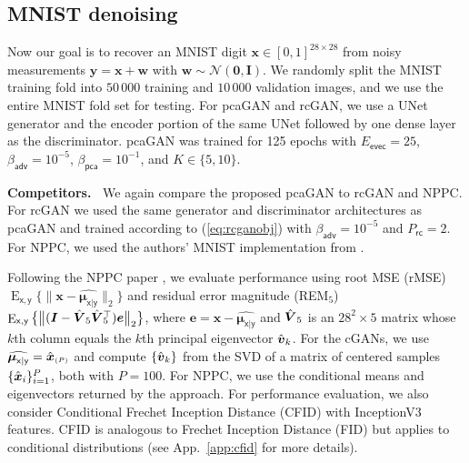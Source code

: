 \documentclass{article}
\theoremstyle{plain}
\theoremstyle{definition}
\theoremstyle{remark}
\renewcommand{\hat}{\widehat}
\newcommand{\hvec}[1]{\ensuremath{\Hat{\boldsymbol{#1}}}}
\renewcommand{\vec}[1]{\ensuremath{\boldsymbol{#1}}}
\newcommand{\mc}[1]{\ensuremath{\mathcal{#1}}}
\newcommand{\tran}{^{\top}}
\DeclareMathOperator{\E}{E}
\renewcommand{\eqref}[1]{(\ref{eq:#1})}
\newcommand{\secref}[1]{Sec.~\ref{sec:#1}}
\newcommand{\appref}[1]{App.~\ref{app:#1}}
\newcommand{\textr}[1]{\textcolor{red}{#1}}
\newcommand{\train}{_{\mathsf{rc}}}
\newcommand{\evec}{_{\mathsf{evec}}}
\newcommand{\betaadv}{\beta_{\mathsf{adv}}}
\newcommand{\betapca}{\beta_{\mathsf{pca}}}
\newcommand{\avgP}{_{\scriptscriptstyle (P)}}
\newcommand{\Exy}{\E_{\mathsf{x,y}}}
\newcommand{\muxgy}{\vec{\mu}_{\mathsf{x}|\mathsf{y}}}
\begin{document}

\subsection{MNIST denoising}\label{sec:mnistdenoising}
Now our goal is to recover an MNIST digit $\vec{x}\in[0,1]^{28\times 28}$ from noisy measurements $\vec{y} = \vec{x} + \vec{w}$ with $\vec{w}\sim\mc{N}(\vec{0}, \vec{I})$. 
We randomly split the MNIST training fold into $50\,000$ training and $10\,000$ validation images, and we use the entire MNIST fold set for testing.
For pcaGAN and rcGAN, we use a UNet \cite{Ronneberger:MICCAI:15} generator and the encoder portion of the same UNet followed by one dense layer as the discriminator.
pcaGAN was trained for 125 epochs with $E\evec=25$, $\betaadv=10^{-5}$, $\betapca=10^{-1}$, and $K\in\{5,10\}$.

\textbf{Competitors.~}
We again compare the proposed pcaGAN to rcGAN and NPPC.
For rcGAN we used the same generator and discriminator architectures as pcaGAN and trained according to \eqref{rcganobj} with $\betaadv=10^{-5}$ and $P\train=2$.
For NPPC, we used the authors' MNIST implementation from \cite{Nehme:github:23}.

Following the NPPC paper \cite{Nehme:NIPS:23}, we evaluate performance using root MSE (rMSE) $\Exy\{\|\vec{x} - \hat{\muxgy}\|_2\}$ and residual error magnitude (REM$_5$) $\Exy\big\{\big\|(\vec{I} - \hvec{V}_5\hvec{V}_5\hspace{-1.5mm}\tran)\vec{e}\big\|_2\big\}$, where $\vec{e} = \vec{x} - \hat{\muxgy}$ and $\hvec{V}_5$ is an $28^2\times5$ matrix whose $k$th column equals the $k$th principal eigenvector $\hvec{v}_k$.
For the cGANs, we use $\hat{\muxgy}=\hvec{x}\avgP$ and compute $\{\hvec{v}_k\}$ from the SVD of a matrix of centered samples $\{\hvec{x}_i\}_{i=1}^P$, both with $P=100$.
For NPPC, we use the conditional means and eigenvectors returned by the approach.
For performance evaluation, we also consider Conditional Frechet Inception Distance (CFID) \cite{Soloveitchik:21} with InceptionV3 features.
CFID is analogous to Frechet Inception Distance (FID) \cite{Heusel:NIPS:17} but applies to conditional distributions (see \appref{cfid} for more details). 
\end{document}
